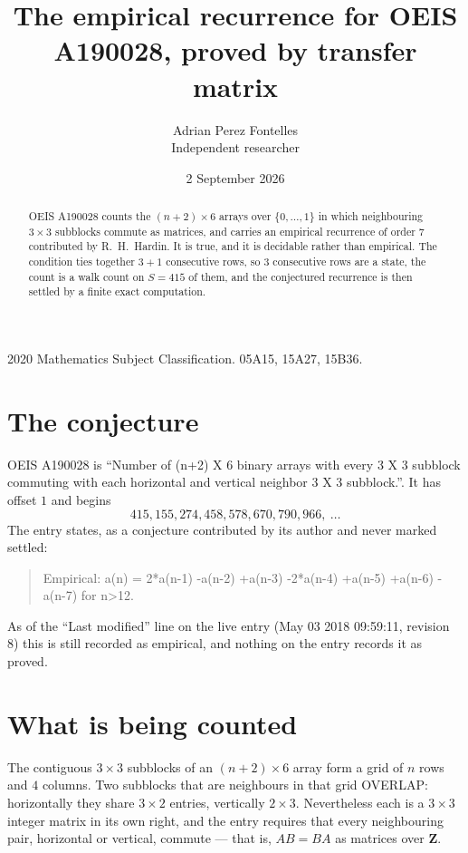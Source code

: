 \documentclass[11pt,a4paper]{article}
\title{The empirical recurrence for OEIS A190028, proved by transfer matrix}
\author{Adrian Perez Fontelles\\ \small Independent researcher}
\date{2 September 2026}
\theoremstyle{plain}
\theoremstyle{definition}
\begin{document}
\maketitle

\begin{abstract}
OEIS A190028 counts the $(n+2)\times6$ arrays over $\{0,\dots,1\}$ in which
neighbouring $3\times3$ subblocks commute as matrices, and carries an empirical recurrence
of order $7$ contributed by R.~H.~Hardin. It is true, and it is decidable rather than
empirical. The condition ties together $3+1$ consecutive rows, so $3$ consecutive rows are
a state, the count is a walk count on $S=415$ of them, and the conjectured recurrence is then
settled by a finite exact computation.
\end{abstract}

\noindent\small 2020 Mathematics Subject Classification. 05A15, 15A27, 15B36.\normalsize

\section{The conjecture}

OEIS A190028 is ``Number of (n+2) X 6 binary arrays with every 3 X 3 subblock commuting with each horizontal and vertical neighbor 3 X 3 subblock.''. It has offset $1$ and begins
\[
415, 155, 274, 458, 578, 670, 790, 966,\ \dots
\]
The entry states, as a conjecture contributed by its author and never marked settled:
\begin{quote}
Empirical: a(n) = 2*a(n-1) -a(n-2) +a(n-3) -2*a(n-4) +a(n-5) +a(n-6) -a(n-7) for n>12.
\end{quote}
As of the ``Last modified'' line on the live entry (May 03 2018 09:59:11, revision 8) this is still
recorded as empirical, and nothing on the entry records it as proved.

\section{What is being counted}

The contiguous $3\times3$ subblocks of an $(n+2)\times6$ array form a grid of $n$
rows and $4$ columns. Two subblocks that are neighbours in that
grid OVERLAP: horizontally they share $3\times2$ entries, vertically
$2\times3$. Nevertheless each is a $3\times3$ integer matrix in its own right, and
the entry requires that every neighbouring pair, horizontal or vertical, commute --- that is,
$AB=BA$ as matrices over $\mathbf{Z}$.
\end{document}
